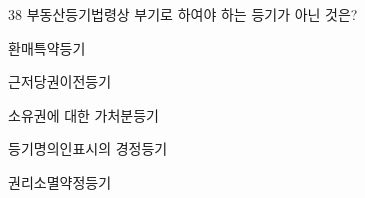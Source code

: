\begin{question}{38}
부동산등기법령상 부기로 하여야 하는 등기가 아닌 것은?
\begin{choices}
  \item 환매특약등기
  \item 근저당권이전등기
  \item 소유권에 대한 가처분등기
  \item 등기명의인표시의 경정등기
  \item 권리소멸약정등기
\end{choices}
\end{question}
